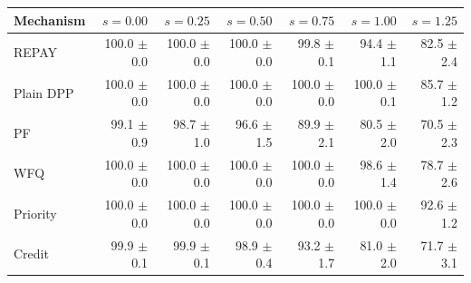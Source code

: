 \begin{tabular}{lrrrrrr}
\toprule
Mechanism & $s=0.00$ & $s=0.25$ & $s=0.50$ & $s=0.75$ & $s=1.00$ & $s=1.25$ \\
\midrule
REPAY & 100.0 $\pm$ 0.0 & 100.0 $\pm$ 0.0 & 100.0 $\pm$ 0.0 & 99.8 $\pm$ 0.1 & 94.4 $\pm$ 1.1 & 82.5 $\pm$ 2.4 \\
Plain DPP & 100.0 $\pm$ 0.0 & 100.0 $\pm$ 0.0 & 100.0 $\pm$ 0.0 & 100.0 $\pm$ 0.0 & 100.0 $\pm$ 0.1 & 85.7 $\pm$ 1.2 \\
PF & 99.1 $\pm$ 0.9 & 98.7 $\pm$ 1.0 & 96.6 $\pm$ 1.5 & 89.9 $\pm$ 2.1 & 80.5 $\pm$ 2.0 & 70.5 $\pm$ 2.3 \\
WFQ & 100.0 $\pm$ 0.0 & 100.0 $\pm$ 0.0 & 100.0 $\pm$ 0.0 & 100.0 $\pm$ 0.0 & 98.6 $\pm$ 1.4 & 78.7 $\pm$ 2.6 \\
Priority & 100.0 $\pm$ 0.0 & 100.0 $\pm$ 0.0 & 100.0 $\pm$ 0.0 & 100.0 $\pm$ 0.0 & 100.0 $\pm$ 0.0 & 92.6 $\pm$ 1.2 \\
Credit & 99.9 $\pm$ 0.1 & 99.9 $\pm$ 0.1 & 98.9 $\pm$ 0.4 & 93.2 $\pm$ 1.7 & 81.0 $\pm$ 2.0 & 71.7 $\pm$ 3.1 \\
\bottomrule
\end{tabular}
